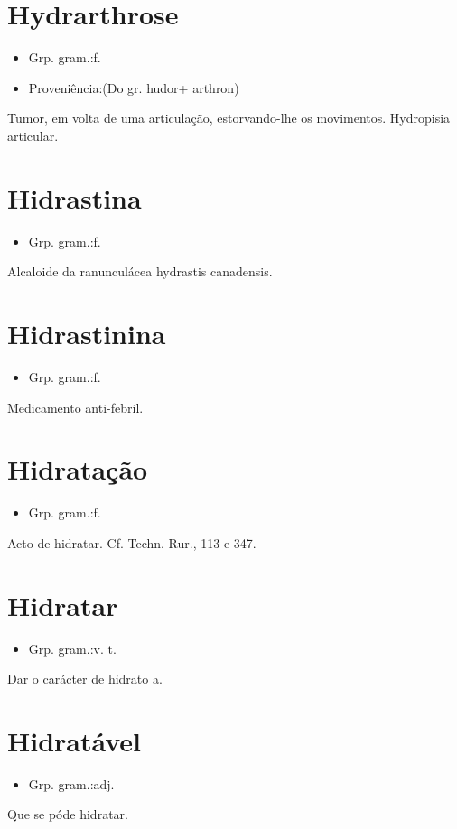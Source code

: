 \documentclass{article}
\begin{document}
\section{Hydrarthrose}
\begin{itemize}
\item {Grp. gram.:f.}
\end{itemize}
\begin{itemize}
\item {Proveniência:(Do gr. \textunderscore hudor\textunderscore  + \textunderscore arthron\textunderscore )}
\end{itemize}
Tumor, em volta de uma articulação, estorvando-lhe os movimentos.
Hydropisia articular.
\section{Hidrastina}
\begin{itemize}
\item {Grp. gram.:f.}
\end{itemize}
Alcaloide da ranunculácea \textunderscore hydrastis canadensis\textunderscore .
\section{Hidrastinina}
\begin{itemize}
\item {Grp. gram.:f.}
\end{itemize}
Medicamento anti-febril.
\section{Hidratação}
\begin{itemize}
\item {Grp. gram.:f.}
\end{itemize}
Acto de hidratar. Cf. \textunderscore Techn. Rur.\textunderscore , 113 e 347.
\section{Hidratar}
\begin{itemize}
\item {Grp. gram.:v. t.}
\end{itemize}
Dar o carácter de hidrato a.
\section{Hidratável}
\begin{itemize}
\item {Grp. gram.:adj.}
\end{itemize}
Que se póde hidratar.
\end{document}
